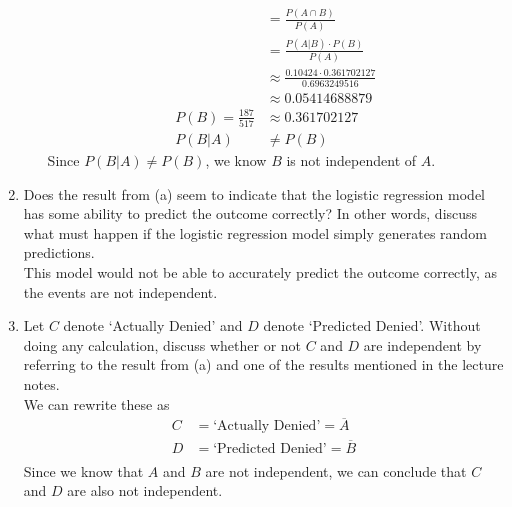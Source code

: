 \documentclass{article}
\begin{document}
\begin{enumerate}[label=\alph*)]
\begin{enumerate}[label=Method \arabic*.]
\begin{align*}
                                               & =\frac{P(A \cap B)}{P(A)}                              \\
                                               & = \frac{P(A \vert B) \cdot P(B)}{P(A)}                 \\
                                               & \approx \frac{0.10424 \cdot 0.361702127}{0.6963249516} \\
                                               & \approx 0.05414688879                                  \\
                        P(B) = \frac{187}{517} & \approx   0.361702127                                  \\
                        P(B \vert A)           & \neq P(B)
                    \end{align*}
                    Since \(P(B \vert A) \neq P(B)\), we know \(B\) is not independent of \(A\).
          \end{enumerate}

    \item Does the result from (a) seem to indicate that the logistic regression model has some
          ability to predict the outcome correctly? In other words, discuss what must happen if the
          logistic regression model simply generates random predictions. \\
          This model would not be able to accurately predict the outcome correctly, as the events are not independent.
    \item Let \(C\) denote ‘Actually Denied’ and \(D\) denote ‘Predicted Denied’. Without doing any
          calculation, discuss whether or not \(C\) and \(D\) are independent by referring to the result from (a)
          and one of the results mentioned in the lecture notes. \\
          We can rewrite these as
          \begin{align*}
              C & = \text{`Actually Denied'} = \overline{A}  \\
              D & = \text{`Predicted Denied'} = \overline{B} \\
          \end{align*}
          Since we know that \(A\) and \(B\) are not independent, we can conclude that \(C\) and \(D\) are also not independent.
\end{enumerate}

\pagebreak
\end{document}
